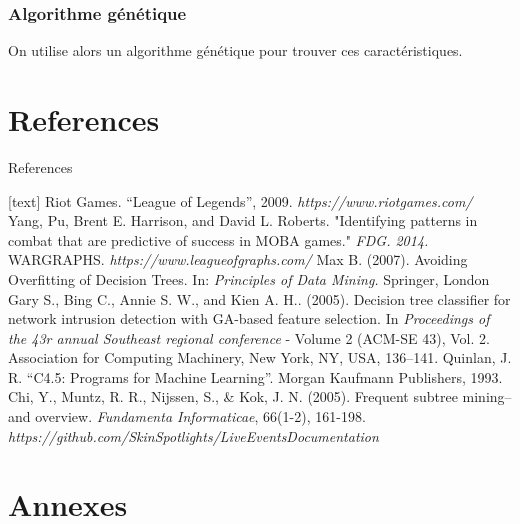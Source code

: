 \documentclass{beamer}
\begin{document}
\begin{frame}
    \frametitle{Algorithme génétique}
    On utilise alors un algorithme génétique\cite{gary} pour trouver ces caractéristiques.
\end{frame}

\section{References}

\begin{frame}{References}
    \scriptsize
    \begin{thebibliography}{9}
        [text]
            Riot Games.
            “League of Legends”, 2009.
            \emph{https://www.riotgames.com/}
            Yang, Pu, Brent E. Harrison, and David L. Roberts.
            "Identifying patterns in combat that are predictive of success in MOBA games."
            \emph{FDG. 2014.}
            WARGRAPHS.
            \emph{https://www.leagueofgraphs.com/}
            Max B. (2007).
            Avoiding Overfitting of Decision Trees.
            In: \emph{Principles of Data Mining.}
            Springer, London
            Gary S., Bing C., Annie S. W., and Kien A. H.. (2005).
            Decision tree classifier for network intrusion detection with GA-based feature selection.
            In \emph{Proceedings of the 43r annual Southeast regional conference}
            - Volume 2 (ACM-SE 43), Vol. 2. Association for Computing Machinery, New York, NY, USA, 136–141.
            Quinlan, J. R.
            “C4.5: Programs for Machine Learning”.
            Morgan Kaufmann Publishers, 1993.
            Chi, Y., Muntz, R. R., Nijssen, S., \& Kok, J. N. (2005).
            Frequent subtree mining–and overview.
            \emph{Fundamenta Informaticae},
            66(1-2), 161-198.
            \emph{https://github.com/SkinSpotlights/LiveEventsDocumentation}
    \end{thebibliography}
\end{frame}

\section{Annexes}
\end{document}
